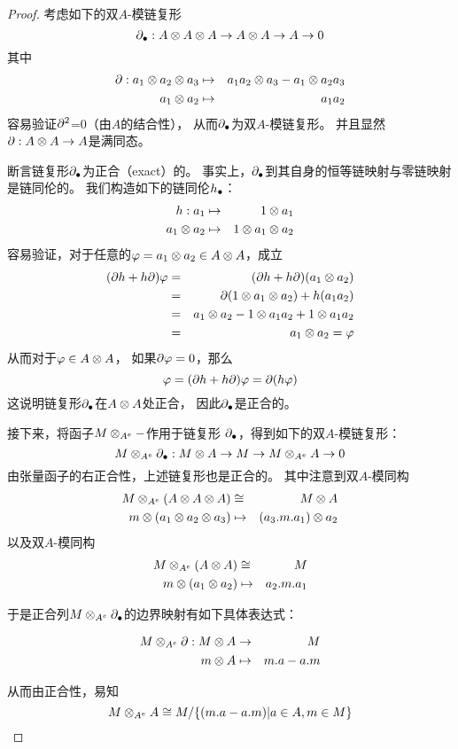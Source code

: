 \begin{proof}
考虑如下的双$A$-模链复形
$$\partial_{\bullet}:A\otimes A\otimes A\rightarrow A\otimes A\rightarrow A\rightarrow 0$$
其中
\begin{eqnarray*}
\partial:a_1\otimes a_2\otimes a_3 &\mapsto& a_1a_2\otimes a_3-a_1\otimes a_2a_3\\
a_1\otimes a_2&\mapsto&a_1a_2
\end{eqnarray*}
容易验证$\partial^2$=0（由$A$的结合性），
从而$\partial_{\bullet}$为双$A$-模链复形。
并且显然$\partial:A\otimes A\rightarrow A$是满同态。

断言链复形$\partial_{\bullet}$为正合（exact）的。
事实上，$\partial_{\bullet}$到其自身的恒等链映射与零链映射是链同伦的。
我们构造如下的链同伦$h_{\bullet}$：
\begin{eqnarray*}
h:a_1&\mapsto&1\otimes a_1\\
a_1\otimes a_2&\mapsto&1\otimes a_1\otimes a_2
\end{eqnarray*}
容易验证，对于任意的$\varphi=a_1\otimes a_2\in A\otimes A$，成立
\begin{eqnarray*}
   (\partial h+h\partial)\varphi
&=&(\partial h+h\partial)(a_1\otimes a_2)\\
&=&\partial(1\otimes a_1\otimes a_2)+h(a_1a_2)\\
&=&a_1\otimes a_2-1\otimes a_1a_2+1\otimes a_1a_2\\
&=&a_1\otimes a_2=\varphi\\
\end{eqnarray*}
从而对于$\varphi\in A\otimes A$，
如果$\partial\varphi=0$，那么
$$\varphi=(\partial h+h\partial)\varphi=\partial(h\varphi)$$
这说明链复形$\partial_{\bullet}$在$A\otimes A$处正合，
因此$\partial_{\bullet}$是正合的。\vs

接下来，将函子$M\otimes_{A^e}-$作用于链复形
$\partial_{\bullet}$，得到如下的双$A$-模链复形：
$$M\otimes_{A^e}\partial_{\bullet}:
M\otimes A\rightarrow M\rightarrow M\otimes_{A^e}A\rightarrow 0$$
由张量函子的右正合性，上述链复形也是正合的。
其中注意到双$A$-模同构
\begin{eqnarray*}
M\otimes_{A^e}(A\otimes A\otimes A)&\cong& M\otimes A\\
m\otimes(a_1\otimes a_2\otimes a_3)&\mapsto&(a_3.m.a_1)\otimes a_2
\end{eqnarray*}
以及双$A$-模同构
\begin{eqnarray*}
M\otimes_{A^e}(A\otimes A)&\cong& M\\
m\otimes(a_1\otimes a_2)&\mapsto& a_2.m.a_1
\end{eqnarray*}

于是正合列$M\otimes_{A^e}\partial_{\bullet}$的边界映射有如下具体表达式：

\begin{eqnarray*}
M\otimes_{A^e}\partial:
M\otimes A&\to& M\\
m\otimes A&\mapsto&m.a-a.m
\end{eqnarray*}

从而由正合性，易知
$$M\otimes_{A^e}A\cong M/\{(m.a-a.m)|a\in A,m\in M\}$$
\end{proof}

